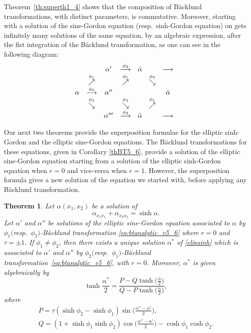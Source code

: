 \documentclass[pdftex]{sigma}
\numberwithin{equation}{section}
\newtheorem{Theorem}{Theorem}[section]
\begin{document}
Theorem~\ref{th:superth1_4} shows that the composition of B\"acklund transformations, with distinct parameters, is commutative. Moreover, starting with a solution of the sine-Gordon equation
(resp.\ sinh-Gordon equation) on gets infinitely many solutions of the same equation, by an algebraic expression, after the fist integration of the B\"acklund transformation, as one can see in the following diagram:
\begin{equation}\label{diagram}
\begin{array}{@{}ccccccc}
 & & \alpha'& \stackrel{\phi_2}{\longrightarrow}& \bar{\alpha} & & \longrightarrow\\
 & \stackrel{\phi_1}{\nearrow}& & \stackrel{\phi_1}{\nearrow}& &\stackrel{\phi_3}{\searrow}\\
\alpha& \stackrel{\phi_2}{\longrightarrow}& \alpha''& & & & \hat{\alpha} \\
 & \stackrel{\phi_3}{\searrow}& & \stackrel{\phi_3}{\searrow} & &\stackrel{\phi_1}{\nearrow} \\
 & & \alpha'''& \stackrel{\phi_2}{\longrightarrow}& \tilde{\alpha} & &\longrightarrow
\end{array}
\end{equation}

Our next two theorems provide the superposition formulae for the elliptic sinh-Gordon and the elliptic sine-Gordon equations. The B\"acklund transformations for these equations, given in Corollary \ref{thBT5_6}, provide a solution of the elliptic sine-Gordon equation starting from a solution of the elliptic sinh-Gordon equation when $r=0$ and vice-versa when $r=1$. However, the superposition formula gives a new solution of the equation we started with, before applying any B\"acklund transformation.

\begin{Theorem}\label{th:super5}
Let $\alpha(x_1,x_2)$ be a solution of
\begin{equation}\label{elipsinh}
\alpha_{x_1x_1}+\alpha_{x_2x_2}=\sinh \alpha.
\end{equation}
Let $\alpha'$ and $\alpha''$ be solutions of the elliptic sine-Gordon equation associated to $\alpha$ by $\phi_1($resp.\ $\phi_2)$-B\"acklund transformation \eqref{eq:btanalytic_v5_6} where $r=0$ and $\tau=\pm 1$.
If $\phi_1\neq \phi_2$, then there exists a unique solution $\alpha^*$ of \eqref{elipsinh} which is associated to
$\alpha'$ and $\alpha''$ by $\phi_2($resp.\ $\phi_1)$-B\"acklund transformation~\eqref{eq:btanalytic_v5_6}, with $r=0$. Moreover, $\alpha^*$ is
given algebraically by
\begin{equation}\label{eq:superposcas5}
\tanh \frac{\alpha^*}{2}=
 \frac{P-Q \tanh \bigl({\frac{\alpha}{2}}\bigr)} {Q-P \tanh \bigl({\frac{\alpha}{2}}\bigr)},
\end{equation}
where
\begin{gather*}
P=\tau(\sinh\phi_2-\sinh\phi_1) \sin\biggl(\frac{\alpha''-\alpha'}{2}\biggr), \\
Q=(1+\sinh\phi_1\sinh\phi_2)\cos\biggl(\frac{\alpha''-\alpha'}{2}\biggr) -\cosh\phi_1\cosh\phi_2.
\end{gather*}
\end{Theorem}
\end{document}
